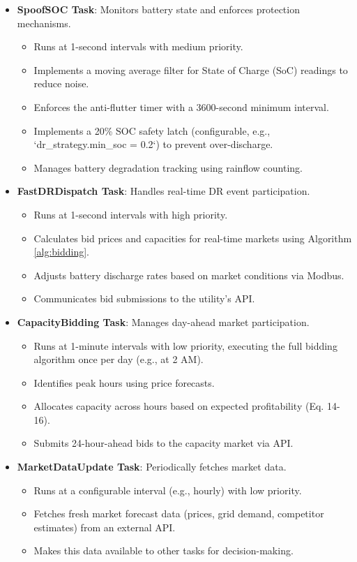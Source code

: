 \documentclass[11pt,a4paper]{article}
\begin{document}
\begin{itemize}
    \item \textbf{SpoofSOC Task}: Monitors battery state and enforces protection mechanisms.
    \begin{itemize}
        \item Runs at 1-second intervals with medium priority.
        \item Implements a moving average filter for State of Charge (SoC) readings to reduce noise.
        \item Enforces the anti-flutter timer with a 3600-second minimum interval.
        \item Implements a 20\% SOC safety latch (configurable, e.g., `dr_strategy.min_soc = 0.2`) to prevent over-discharge.
        \item Manages battery degradation tracking using rainflow counting.
    \end{itemize}
    
    \item \textbf{FastDRDispatch Task}: Handles real-time DR event participation.
    \begin{itemize}
        \item Runs at 1-second intervals with high priority.
        \item Calculates bid prices and capacities for real-time markets using Algorithm \ref{alg:bidding}.
        \item Adjusts battery discharge rates based on market conditions via Modbus.
        \item Communicates bid submissions to the utility's API.
    \end{itemize}
    
    \item \textbf{CapacityBidding Task}: Manages day-ahead market participation.
    \begin{itemize}
        \item Runs at 1-minute intervals with low priority, executing the full bidding algorithm once per day (e.g., at 2 AM).
        \item Identifies peak hours using price forecasts.
        \item Allocates capacity across hours based on expected profitability (Eq. 14-16).
        \item Submits 24-hour-ahead bids to the capacity market via API.
    \end{itemize}
    
    \item \textbf{MarketDataUpdate Task}: Periodically fetches market data.
    \begin{itemize}
        \item Runs at a configurable interval (e.g., hourly) with low priority.
        \item Fetches fresh market forecast data (prices, grid demand, competitor estimates) from an external API.
        \item Makes this data available to other tasks for decision-making.
    \end{itemize}
\end{itemize}
\end{document}

